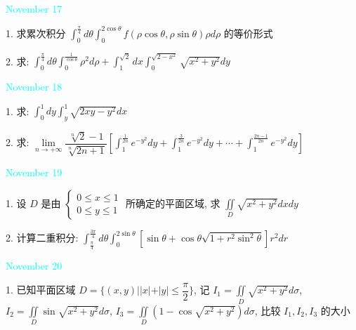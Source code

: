 \textcolor{cyan}{November 17}

1. 求累次积分 $\displaystyle{\int_{0}^{\frac{\pi}{4}}d\theta\int_{0}^{2\cos\theta}f(\rho\cos\theta,\rho\sin\theta)\rho d\rho}$ 的等价形式
\begin{solution}
	
\end{solution}

2. 求: $\displaystyle{\int_{0}^{\frac{\pi}{4}}d\theta\int_{0}^{\frac{1}{\cos\theta}}\rho^2d\rho+\int_{1}^{\sqrt{2}}dx\int_{0}^{\sqrt{2-x^2}}\sqrt{x^2+y^2}dy}$
\begin{solution}
	
\end{solution}

\textcolor{cyan}{November 18}

1. 求: $\displaystyle{\int_{0}^{1}dy\int_{y}^{1}\sqrt{2xy-y^2}dx}$
\begin{solution}
	
\end{solution}

2. 求: $\displaystyle{\lim\limits_{n\to +\infty}\dfrac{\sqrt[n]{2}-1}{\sqrt[n]{2n+1}}\left[\int_{1}^{\frac{1}{2n}}e^{-y^2}dy+\int_{1}^{\frac{3}{2n}}e^{-y^2}dy+\cdots+\int_{1}^{\frac{2n-1}{2n}}e^{-y^2}dy \right]}$
\begin{solution}
	
\end{solution}

\textcolor{cyan}{November 19}

1. 设 $D$ 是由 $
\begin{cases}
	0\leq x\leq 1 \\
	0\leq y\leq 1
\end{cases}$ 所确定的平面区域, 求 $\iint\limits_{D}\sqrt{x^2+y^2}dxdy$
\begin{solution}
	
\end{solution}


2. 计算二重积分: $\displaystyle{\int_{\frac{\pi}{4}}^{\frac{3\pi}{4}}d\theta\int_{0}^{2\sin\theta}\left[ \sin\theta+\cos\theta\sqrt{1+r^2\sin^{2}\theta}\right]r^2dr}$
\begin{solution}
	
\end{solution}

\textcolor{cyan}{November 20}

1. 已知平面区域 $\displaystyle{D=\{(x,y)||x|+|y|\leq \dfrac{\pi}{2}\}}$,
记 $\displaystyle {I_{1}=\iint\limits_{D}\sqrt{x^2+y^2}d\sigma}$,
$\displaystyle{I_{2}=\iint\limits_{D}\sin\sqrt{x^2+y^2}d\sigma}$,
$\displaystyle{I_{3}=\iint\limits_{D}(1-\cos\sqrt{x^2+y^2})d\sigma}$, 比较 $I_{1},I_{2},I_{3}$ 的大小
\begin{solution}
	
\end{solution}


